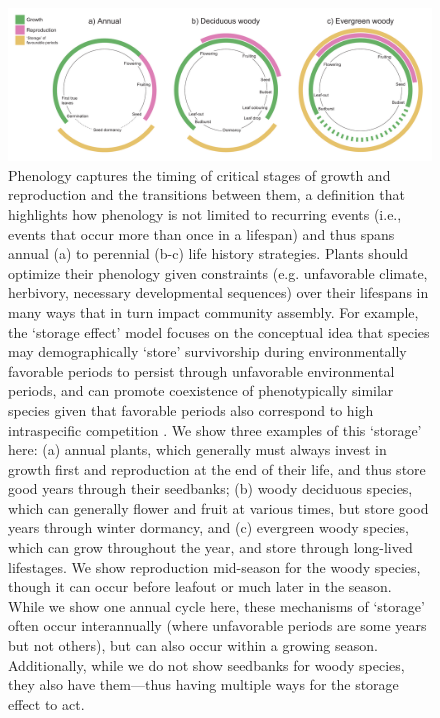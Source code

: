 \documentclass[11pt]{article}
\begin{document}
\begin{figure}[h!]
\centering
\includegraphics[width=1\textwidth]{..//figures/figsubmit/phenologycircles_2023.1.13.pdf}
\caption{Phenology captures the timing of critical stages of growth and reproduction and the transitions between them, a definition that highlights how phenology is not limited to recurring events (i.e., events that occur more than once in a lifespan) and thus spans annual (a) to perennial (b-c) life history strategies.  Plants should optimize their phenology given constraints (e.g. unfavorable climate, herbivory, necessary developmental sequences) over their lifespans in many ways that in turn impact community assembly. For example, the `storage effect' model focuses on the conceptual idea that species may demographically  `store' survivorship during environmentally favorable periods to persist through unfavorable environmental periods, and can promote coexistence of phenotypically similar species given that favorable periods also correspond to high intraspecific competition \citep[][and see text for more details]{Chesson:2000vd}. We show three examples of this `storage' here: (a) annual plants, which generally must always invest in growth first and reproduction at the end of their life, and thus store good years through their seedbanks; (b) woody deciduous species, which can generally flower and fruit at various times, but store good years through winter dormancy, and (c) evergreen woody species, which can grow throughout the year, and store through long-lived lifestages. We show reproduction mid-season for the woody species, though it can occur before leafout or much later in the season. While we show one annual cycle here, these mechanisms of `storage' often occur interannually (where unfavorable periods are some years but not others), but can also occur within a growing season. Additionally, while we do not show seedbanks for woody species, they also have them---thus having multiple ways for the storage effect to act.}
 \label{fig:phenologycircles}
\end{figure}
\end{document}
